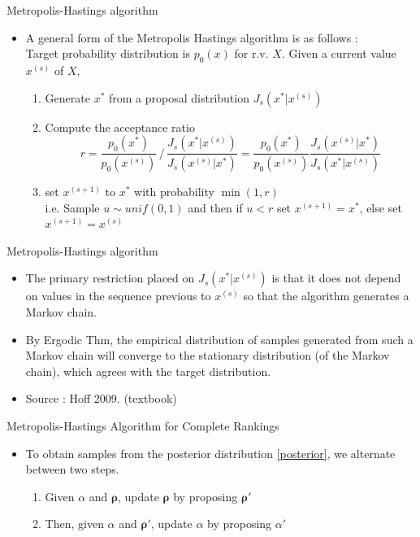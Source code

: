 \documentclass[11pt]{beamer}
\begin{document}
\begin{frame}{Metropolis-Hastings algorithm}
\begin{itemize}
    \item A general form of the Metropolis Hastings algorithm is as follows : \\ Target probability distribution is $p_0(x)$ for r.v. $X$. Given a current value $x^{(s)}$ of $X$, 
        \begin{enumerate}
            \item Generate $x^{*}$ from a proposal distribution $J_s(x^{*}|x^{(s)})$
            \item Compute the acceptance ratio $$ r=\frac{p_0(x^*)}{p_0(x^{(s)})}\, /\, \frac{J_s(x^*|x^{(s)})}{J_s(x^{(s)}|x^*)} = \frac{p_0(x^*)}{p_0(x^{(s)})}\frac{J_s(x^{(s)}|x^*)}{J_s(x^*|x^{(s)})} $$
            \item set $x^{(s+1)}$ to $x^*$ with probability $\min (1, r)$ \\ i.e. Sample $u\sim unif(0,1)$ and then if $u<r$ set $x^{(s+1)}=x^*$, else set $x^{(s+1)}=x^{(s)}$
        \end{enumerate}
\end{itemize}
\end{frame}

\begin{frame}{Metropolis-Hastings algorithm}
\begin{itemize}
    \item The primary restriction placed on $J_s(x^*|x^{(s)})$ is that it does not depend on values in the sequence previous to $x^{(s)}$ so that the algorithm generates a Markov chain.
    \item By Ergodic Thm, the empirical distribution of samples generated from such a Markov chain will converge to the stationary distribution (of the Markov chain), which agrees with the target distribution.
    \item Source : Hoff 2009. (textbook)
\end{itemize}
\end{frame}

\begin{frame}{Metropolis-Hastings Algorithm for Complete Rankings}
\begin{itemize}
    \item To obtain samples from the posterior distribution \eqref{posterior}, we alternate between two steps.
    \begin{enumerate}
        \item Given $\alpha$ and $\boldsymbol{\rho}$, update $\boldsymbol{\rho}$ by proposing $\boldsymbol{\rho}'$
        \item Then, given $\alpha$ and $\boldsymbol{\rho}'$, update $\alpha$ by proposing $\alpha'$
    \end{enumerate}
\end{itemize}
\end{frame}
\end{document}
